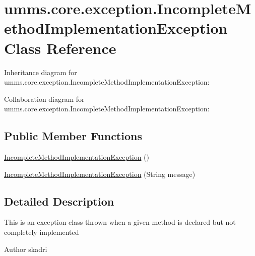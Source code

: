 \hypertarget{classumms_1_1core_1_1exception_1_1_incomplete_method_implementation_exception}{\section{umms.\+core.\+exception.\+Incomplete\+Method\+Implementation\+Exception Class Reference}
\label{classumms_1_1core_1_1exception_1_1_incomplete_method_implementation_exception}
}


Inheritance diagram for umms.\+core.\+exception.\+Incomplete\+Method\+Implementation\+Exception\+:


Collaboration diagram for umms.\+core.\+exception.\+Incomplete\+Method\+Implementation\+Exception\+:
\subsection*{Public Member Functions}
\begin{DoxyCompactItemize}
\item 
\hyperlink{classumms_1_1core_1_1exception_1_1_incomplete_method_implementation_exception_a569252b49e341c36ab7b10d2660d2794}{Incomplete\+Method\+Implementation\+Exception} ()
\item 
\hyperlink{classumms_1_1core_1_1exception_1_1_incomplete_method_implementation_exception_a936015da42cd5b9d71dfd03f95db7338}{Incomplete\+Method\+Implementation\+Exception} (String message)
\end{DoxyCompactItemize}


\subsection{Detailed Description}
This is an exception class thrown when a given method is declared but not completely implemented \begin{DoxyAuthor}{Author}
skadri 
\end{DoxyAuthor}


